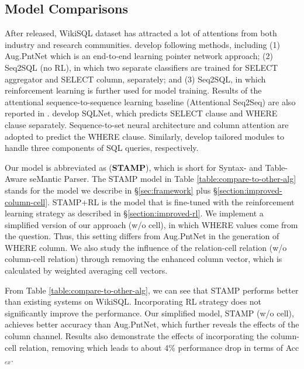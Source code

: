 \documentclass[11pt,a4paper]{article}
\begin{document}
\subsection{Model Comparisons}
After released, WikiSQL dataset has attracted a lot of attentions from both industry and research communities.
 develop following methods, including (1)
{Aug.PntNet} which is an end-to-end learning pointer network approach;
	(2) {Seq2SQL (no RL)}, in which two separate classifiers are trained for SELECT aggregator and SELECT column, separately; and (3) {Seq2SQL}, in which reinforcement learning is further used for model training.
	Results of the attentional sequence-to-sequence learning baseline ({Attentional Seq2Seq}) are also reported in \cite{zhong2017seq2sql}. 
	 develop {SQLNet}, which predicts SELECT clause and WHERE clause separately. Sequence-to-set neural architecture and column attention are adopted to predict the WHERE clause.
Similarly,  develop tailored modules to handle three components of SQL queries, respectively.









Our model is abbreviated as (\textbf{STAMP}), which is short for Syntax- and Table- Aware seMantic Parser.
The STAMP model in Table \ref{table:compare-to-other-alg} stands for the model we describe in \S \ref{sec:framework} plus \S \ref{section:improved-column-cell}.
\mbox{STAMP+RL} is the model that is fine-tuned with the reinforcement learning strategy as described in \S \ref{section:improved-rl}.
We implement a simplified version of our approach (w/o cell), in which WHERE values come from the question. Thus, this setting differs from Aug.PntNet in the generation of WHERE \mbox{column}.
We also study the influence of the relation-cell relation (w/o column-cell relation) through removing the enhanced column vector, which is calculated by weighted averaging cell vectors.

From Table \ref{table:compare-to-other-alg}, we can see that STAMP performs better than existing systems on WikiSQL.
Incorporating RL strategy does not significantly improve the performance.
Our simplified model, STAMP (w/o cell), achieves better accuracy than Aug.PntNet,
which further reveals the effects of the column channel.
Results also demonstrate the effects of incorporating the column-cell relation, removing which leads to about 4\% performance drop in terms of Acc$_{ex}$.
\end{document}
